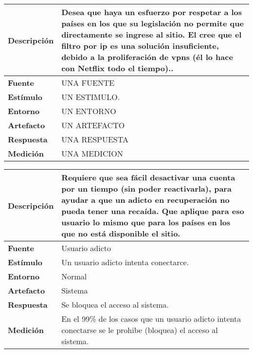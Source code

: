 \begin{center}
  \begin{tabular}{| l | p{10cm} | }
    \hline
  \textbf{Descripción} & Desea que haya un esfuerzo por respetar a los países en los que su legislación no permite que directamente se ingrese al sitio. El cree que el filtro por ip es una solución insuficiente, debido a la proliferación de vpns (él lo hace con Netflix todo el tiempo)..\\  \hline
  \textbf{Fuente} & UNA FUENTE\\  \hline
  \textbf{Estímulo} & UN ESTIMULO.\\  \hline
  \textbf{Entorno} & UN ENTORNO\\  \hline
  \textbf{Artefacto} & UN ARTEFACTO\\  \hline
  \textbf{Respuesta} & UNA RESPUESTA\\  \hline
  \textbf{Medición} & UNA MEDICION\\  \hline
  \end{tabular}
\end{center} 


\begin{center}
  \begin{tabular}{| l | p{10cm} | }
    \hline
  \textbf{Descripción} & Requiere que sea fácil desactivar una cuenta por un tiempo (sin poder reactivarla), para ayudar a que un adicto en recuperación no pueda tener una recaída. Que aplique para eso usuario lo mismo que para los países en los que no está disponible el sitio.\\  \hline
  \textbf{Fuente} & Usuario adicto\\  \hline
  \textbf{Estímulo} & Un usuario adicto intenta conectarce.\\  \hline
  \textbf{Entorno} & Normal\\  \hline
  \textbf{Artefacto} & Sistema\\  \hline
  \textbf{Respuesta} & Se bloquea el acceso al sistema.\\  \hline
  \textbf{Medición} & En el 99\% de los casos que un usuario adicto intenta conectarse se le prohibe (bloquea) el acceso al sistema.\\  \hline
  \end{tabular}
\end{center} 



